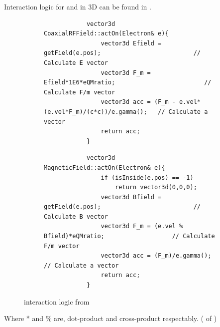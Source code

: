 \documentclass{book}
\begin{document}
Interaction logic for \eE and \eB in 3D can be found in .
\begin{figure}[H]
    \captionsetup[subfigure]{justification=centering}
    \captionsetup{justification=centering}
    \begin{subfigure}{\textwidth}
        \begin{verbatim}
            vector3d CoaxialRFField::actOn(Electron& e){
                vector3d Efield = getField(e.pos);                          // Calculate E vector
                vector3d F_m = Efield*1E6*eQMratio;                         // Calculate F/m vector
                vector3d acc = (F_m - e.vel*(e.vel*F_m)/(c*c))/e.gamma();   // Calculate a vector
                return acc;
            }
        \end{verbatim}
    \end{subfigure}

    \begin{subfigure}{\textwidth}
        \begin{verbatim}
            vector3d MagneticField::actOn(Electron& e){
                if (isInside(e.pos) == -1)
                    return vector3d(0,0,0);
                vector3d Bfield = getField(e.pos);                          // Calculate B vector
                vector3d F_m = (e.vel % Bfield)*eQMratio;                   // Calculate F/m vector
                vector3d acc = (F_m)/e.gamma();                             // Calculate a vector
                return acc;
            }
        \end{verbatim}
    \end{subfigure}
    \caption{\eEM  interaction logic from }
    \label{fig:3D_e_EM_interaction_first}
\end{figure}
Where * and \% are, dot-product and cross-product respectably. ( of )
\end{document}
